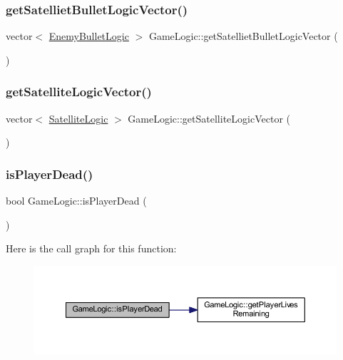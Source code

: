 \subsubsection{\texorpdfstring{get\+Satelliet\+Bullet\+Logic\+Vector()}{getSatellietBulletLogicVector()}}
{\footnotesize\ttfamily vector$<$ \hyperlink{class_enemy_bullet_logic}{Enemy\+Bullet\+Logic} $>$ Game\+Logic\+::get\+Satelliet\+Bullet\+Logic\+Vector (\begin{DoxyParamCaption}{ }\end{DoxyParamCaption})}

\mbox{\label{class_game_logic_a1110f512d8382700d322c6f1895810ea}} 
\subsubsection{\texorpdfstring{get\+Satellite\+Logic\+Vector()}{getSatelliteLogicVector()}}
{\footnotesize\ttfamily vector$<$ \hyperlink{class_satellite_logic}{Satellite\+Logic} $>$ Game\+Logic\+::get\+Satellite\+Logic\+Vector (\begin{DoxyParamCaption}{ }\end{DoxyParamCaption})}

\mbox{\label{class_game_logic_a743d03f2c6dab3786addba9b2bc1e5dc}} 
\subsubsection{\texorpdfstring{is\+Player\+Dead()}{isPlayerDead()}}
{\footnotesize\ttfamily bool Game\+Logic\+::is\+Player\+Dead (\begin{DoxyParamCaption}{ }\end{DoxyParamCaption})}

Here is the call graph for this function\+:
\nopagebreak
\begin{figure}[H]
\begin{center}
\leavevmode
\includegraphics[width=350pt]{class_game_logic_a743d03f2c6dab3786addba9b2bc1e5dc_cgraph}
\end{center}
\end{figure}
\mbox{\label{class_game_logic_af355faaa66630a76a14ef0d7dc5adb54}} 
